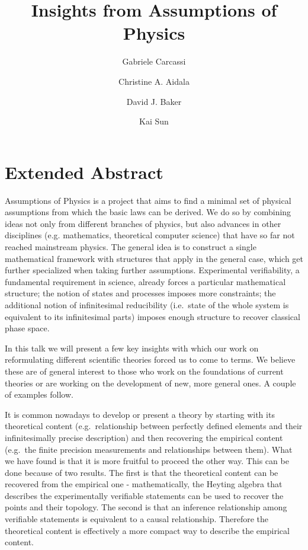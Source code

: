 \documentclass{article}
\begin{document}
	
\title{Insights from Assumptions of Physics}
	
\author[1]{Gabriele Carcassi}
	
\author[1]{Christine A. Aidala}
	
\author[2]{David J. Baker}
	
\author[1]{Kai Sun}
	
	
\maketitle

\section*{Extended Abstract}
Assumptions of Physics\cite{A,B,C,D} is a project that aims to find a minimal set of physical assumptions from which the basic laws can be derived. We do so by combining ideas not only from different branches of physics, but also advances in other disciplines (e.g. mathematics, theoretical computer science) that have so far not reached mainstream physics. The general idea is to construct a single mathematical framework with structures that apply in the general case, which get further specialized when taking further assumptions. Experimental verifiability, a fundamental requirement in science, already forces a particular mathematical structure; the notion of states and processes imposes more constraints; the additional notion of infinitesimal reducibility (i.e.~state of the whole system is equivalent to its infinitesimal parts) imposes enough structure to recover classical phase space.

In this talk we will present a few key insights with which our work on reformulating different scientific theories forced us to come to terms. We believe these are of general interest to those who work on the foundations of current theories or are working on the development of new, more general ones. A couple of examples follow.

It is common nowadays  to develop or present a theory by starting with its theoretical content (e.g.~relationship between perfectly defined elements and their infinitesimally precise description) and then recovering the empirical content (e.g.~the finite precision measurements and relationships between them). What we have found is that it is more fruitful to proceed the other way. This can be done because of two results. The first is that the theoretical content can be recovered from the empirical one - mathematically, the Heyting algebra that describes the experimentally verifiable statements can be used to recover the points and their topology. The second is that an inference relationship among verifiable statements is equivalent to a causal relationship. Therefore the theoretical content is effectively a more compact way to describe the empirical content.
\end{document}
